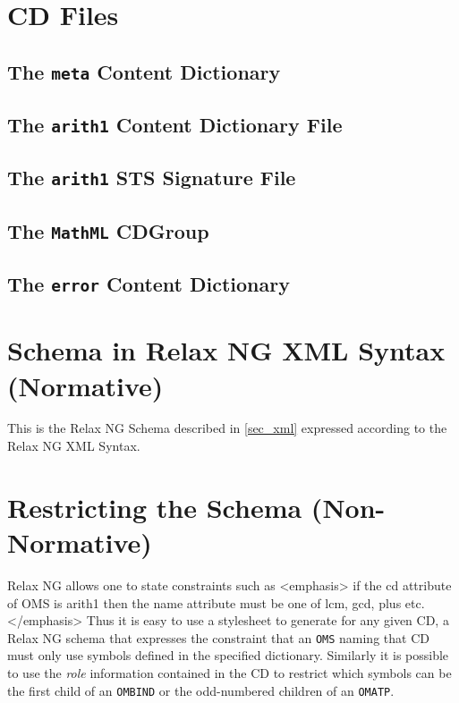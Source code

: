 \begin{appendix}
\chapter{CD Files}\label{app_cdfiles}

\section{The \texttt{meta} Content Dictionary}\label{app_cdcd}


\section{The  \texttt{arith1} Content Dictionary File}\label{arith1.ocd}


\section{The  \texttt{arith1} STS Signature File}\label{arith1.sts}


\section{The  \texttt{MathML} CDGroup}\label{mathml.cdg}


\section{The \texttt{error} Content Dictionary}\label{errorcd}


\chapter{\OM Schema in Relax NG XML Syntax (Normative)}\label{app_openmath.rng}

This is the Relax NG Schema described in \ref{sec_xml} expressed according to the Relax NG
XML Syntax.



\chapter{Restricting the \OM Schema (Non-Normative)}\label{app_relaxrestricted}
Relax NG allows one to state constraints such as <emphasis> if the cd attribute of OMS is
arith1 then the name attribute must be one of lcm, gcd, plus etc.</emphasis> Thus it is
easy to use a stylesheet to generate for any given CD, a Relax NG schema that expresses
the constraint that an \lstinline|OMS| naming that CD must only use symbols defined in
the specified dictionary.  Similarly it is possible to use the \emph{role} information
contained in the CD to restrict which symbols can be the first child of an
\lstinline|OMBIND| or the odd-numbered children of an \lstinline|OMATP|.
  

\end{appendix}
